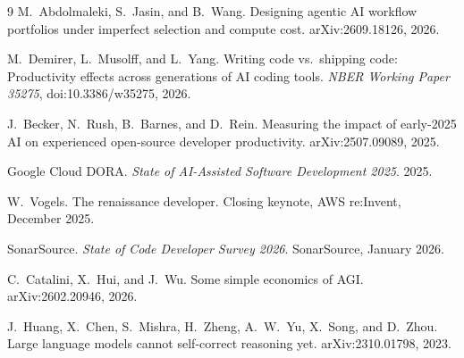 \documentclass[11pt]{article}
\begin{document}
\begin{thebibliography}{9}
M.~Abdolmaleki, S.~Jasin, and B.~Wang. Designing agentic AI workflow portfolios under imperfect
selection and compute cost. arXiv:2609.18126, 2026.

M.~Demirer, L.~Musolff, and L.~Yang. Writing code vs.\ shipping code: Productivity effects across
generations of AI coding tools. \emph{NBER Working Paper 35275}, doi:10.3386/w35275, 2026.

J.~Becker, N.~Rush, B.~Barnes, and D.~Rein. Measuring the impact of early-2025 AI on experienced
open-source developer productivity. arXiv:2507.09089, 2025.

Google Cloud DORA. \emph{State of AI-Assisted Software Development 2025}. 2025.

W.~Vogels. The renaissance developer. Closing keynote, AWS re:Invent, December 2025.

SonarSource. \emph{State of Code Developer Survey 2026}. SonarSource, January 2026.

C.~Catalini, X.~Hui, and J.~Wu. Some simple economics of AGI. arXiv:2602.20946, 2026.

J.~Huang, X.~Chen, S.~Mishra, H.~Zheng, A.~W.~Yu, X.~Song, and D.~Zhou. Large language models
cannot self-correct reasoning yet. arXiv:2310.01798, 2023.

\end{thebibliography}
\end{document}
